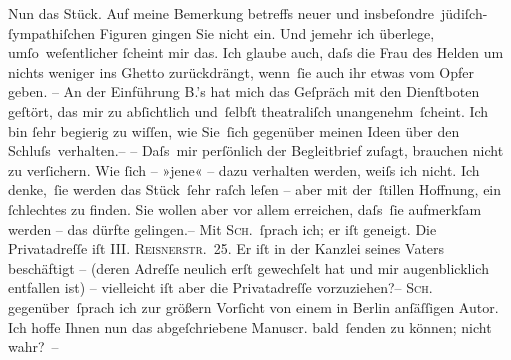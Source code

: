 \pstart
           Nun das Stück. Auf meine
               Bemerkung betreffs neuer und insbeſondre jüdiſch-ſympathiſchen Figuren gingen Sie
               nicht ein. Und jemehr ich überlege, umſo weſentlicher{ }ſcheint mir das. Ich glaube
               auch, daſs die Frau des Helden um nichts weniger ins Ghetto zurückdrängt, wenn ſie
               auch ihr etwas vom Opfer geben. – An der Ein{\pb}führung B.’s hat mich das Geſpräch mit den
               Dienſtboten geſtört, das mir zu abſichtlich und ſelbſt theatraliſch unangenehm ſcheint.
               Ich bin{ }ſehr begierig zu wiſſen, wie Sie ſich gegenüber meinen Ideen über
               den Schluſs verhalten.– – Daſs mir perſönlich der Begleitbrief zuſagt, brauchen nicht
               zu verſichern. Wie{ }ſich – »jene« – dazu verhalten werden, weiſs ich nicht. Ich
               denke, ſie werden das Stück ſehr raſch leſen – aber mit der ſtillen Hoffnung, ein{ }ſchlechtes zu
               finden. Sie wollen aber vor allem erreichen, daſs ſie aufmerkſam werden – das dürfte
               gelingen.– Mit \textsc{Sch.} ſprach ich; {\pb}er iſt geneigt. Die Privatadreſſe iſt
                  \textsc{III. Reisnerstr. 25}. Er iſt in der Kanzlei
               seines Vaters beschäftigt –
               (deren Adreſſe neulich erſt gewechſelt hat und mir augenblicklich entfallen ist) –
               vielleicht iſt aber die Privatadreſſe vorzuziehen?– \textsc{Sch.} gegenüber ſprach ich zur größern Vorſicht von einem in Berlin anſäſſigen Autor. Ich hoffe Ihnen nun das abgeſchriebene
                  Manuscr. bald ſenden zu
               können; nicht wahr? –\pend
           
